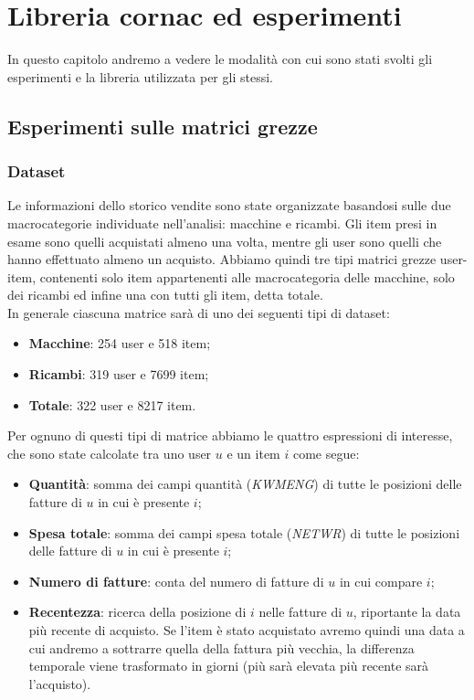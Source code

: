 \hypertarget{(chap:capitolo6)}{}
\chapter{Libreria cornac ed esperimenti}
In questo capitolo andremo a vedere le modalità con cui sono stati svolti gli esperimenti e la libreria utilizzata per gli stessi.
\section{Esperimenti sulle matrici grezze}
\subsection{Dataset}
Le informazioni dello storico vendite sono state organizzate basandosi sulle due macrocategorie individuate nell'analisi: macchine e ricambi.
Gli item presi in esame sono quelli acquistati almeno una volta, mentre gli user sono quelli che hanno effettuato almeno un acquisto.
Abbiamo quindi tre tipi matrici grezze user-item, contenenti solo item appartenenti alle macrocategoria delle macchine, solo dei ricambi ed infine una con tutti gli item, detta totale.\\
In generale ciascuna matrice sarà di uno dei seguenti tipi di dataset:
\begin{itemize}
    \item \textbf{Macchine}: 254 user e 518 item;
    \item \textbf{Ricambi}: 319 user e 7699 item;
    \item \textbf{Totale}: 322 user e 8217 item.
\end{itemize}

Per ognuno di questi tipi di matrice abbiamo le quattro espressioni di interesse, che sono state calcolate tra uno user $u$ e un item $i$ come segue:
\begin{itemize}
    \item \textbf{Quantità}: somma dei campi quantità (\textit{KWMENG}) di tutte le posizioni delle fatture di $u$ in cui è presente $i$;
    \item \textbf{Spesa totale}: somma dei campi spesa totale (\textit{NETWR}) di tutte le posizioni delle fatture di $u$ in cui è presente $i$;
    \item \textbf{Numero di fatture}: conta del numero di fatture di $u$ in cui compare $i$;
    \item \textbf{Recentezza}: ricerca della posizione di $i$ nelle fatture di $u$, riportante la data più recente di acquisto. Se l'item è stato acquistato avremo quindi una data a cui andremo a sottrarre quella della fattura più vecchia, la differenza temporale viene trasformato in giorni (più sarà elevata più recente sarà l'acquisto).
\end{itemize}

